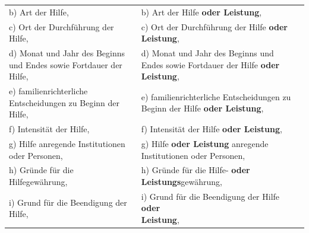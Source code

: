 \documentclass[10pt,a4paper,landscape]{article}
\begin{document}
\begin{longtable}{|L{8.2cm}|L{8.2cm}|L{8.2cm}|}
\hhline{|---|}
b)   \newline Art der Hilfe, & b)   \newline Art der Hilfe \textbf{\textcolor{diffred}{oder Leistung}}, &  \\
\hhline{|---|}
c)   \newline Ort der Durchführung der Hilfe, & c)   \newline Ort der Durchführung der Hilfe \textbf{\textcolor{diffred}{oder  \newline Leistung}}, &  \\
\hhline{|---|}
d)   \newline Monat und Jahr des Beginns und Endes  \newline sowie Fortdauer der Hilfe, & d)   \newline Monat und Jahr des Beginns und Endes  \newline sowie Fortdauer der Hilfe \textbf{\textcolor{diffred}{oder Leistung}}, &  \\
\hhline{|---|}
e)   \newline familienrichterliche Entscheidungen zu  \newline Beginn der Hilfe, & e)   \newline familienrichterliche Entscheidungen zu  \newline Beginn der Hilfe \textbf{\textcolor{diffred}{oder Leistung}}, &  \\
\hhline{|---|}
f)   \newline Intensität der Hilfe, & f)   \newline Intensität der Hilfe \textbf{\textcolor{diffred}{oder Leistung}}, &  \\
\hhline{|---|}
g)   \newline Hilfe anregende Institutionen oder  \newline Personen, & g)   \newline Hilfe \textbf{\textcolor{diffred}{oder Leistung}} anregende  \newline Institutionen oder Personen, &  \\
\hhline{|---|}
h)   \newline Gründe für die Hilfegewährung, & h)   \newline Gründe für die Hilfe- \textbf{\textcolor{diffred}{oder  \newline Leistungs}}gewährung, &  \\
\hhline{|---|}
i)   \newline Grund für die Beendigung der Hilfe, & i)   \newline Grund für die Beendigung der Hilfe \textbf{\textcolor{diffred}{oder  \newline Leistung}}, &  \\

\end{longtable}
\end{document}
